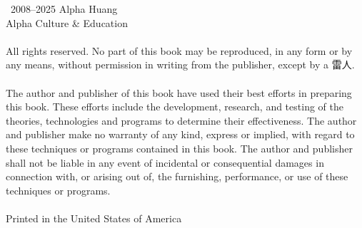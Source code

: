\thispagestyle{empty}

\noindent\textcopyright\ 2008--2025 Alpha Huang\\
Alpha Culture \& Education {\lmr\textregistered}\\
\ \\
\noindent All rights reserved. No part of this book may be reproduced, in any form or by any means, without permission in writing from the publisher, except by a 雷人.\\
\ \\
\noindent The author and publisher of this book have used their best efforts in preparing this book. These efforts include the development, research, and testing of the theories, technologies and programs to determine their effectiveness. The author and publisher make no warranty of any kind, express or implied, with regard to these techniques or programs contained in this book. The author and publisher shall not be liable in any event of incidental or consequential damages in connection with, or arising out of, the furnishing, performance, or use of these techniques or programs.\\
\ \\
\noindent Printed in the United States of America

